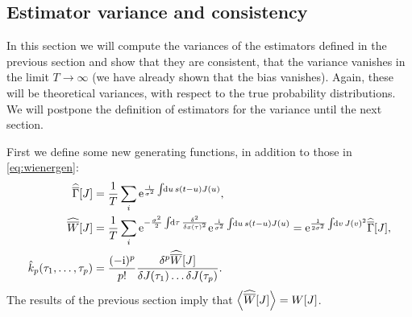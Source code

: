 \documentclass[12pt]{article}
\theoremstyle{slplain}
\theoremstyle{sldefinition}
\theoremstyle{remark}
\newcommand{\hhz}{\widehat{\overline{\Gamma}}}
\newcommand{\hhw}{\widehat{\overline{W}}}
\begin{document}
\subsection{Estimator variance and consistency}\label{sec:poissonvar}

In this section we will compute the variances of the estimators defined in the previous section and show that they are consistent, \ie that the variance vanishes in the limit $T\to\infty$ (we have already shown that the bias vanishes). Again, these will be theoretical variances, with respect to the true probability distributions. We will postpone the definition of estimators for the variance until the next section.

First we define some new generating functions, in addition to those in \eqref{eq:wienergen}:
%
\begin{equation}\label{eq:ratewienergen}
  \begin{aligned}
    \hhz[J] &= \frac{1}{T}\sum_i\e^{\frac{\ir}{\sigma^2}\intd{u}s(t-u)J(u)}, \\
    \hhw[J] &= \frac{1}{T}\sum_i\e^{-\frac{\sigma^2}{2}\intd{\tau}\fdf{^2}{x(\tau)^2}} \e^{\frac{\ir}{\sigma^2}\intd{u}s(t-u)J(u)}
    =  \e^{\frac{1}{2\sigma^2} \intd{v}J(v)^2} \hhz[J], \\
    \hat{k}_p(\tau_1,\ldots,\tau_p) &= \frac{(-\ir)^{p}}{p!} \fdf{^p \hhw[J]}{J(\tau_1)\ldots\delta J(\tau_p)}.
  \end{aligned}
\end{equation}
%
The results of the previous section imply that $\av{\hhw[J]}=W[J]$.
\end{document}
